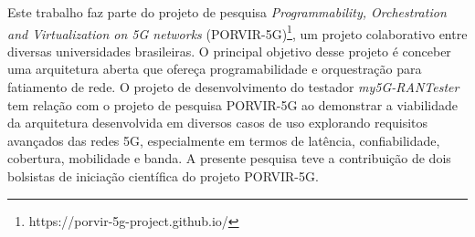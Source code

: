 Este trabalho faz parte do projeto de pesquisa \textit{Programmability, Orchestration and Virtualization on 5G networks} (PORVIR-5G)\footnote{https://porvir-5g-project.github.io/}, um projeto colaborativo entre diversas universidades brasileiras. O principal objetivo desse projeto é conceber uma arquitetura aberta que ofereça programabilidade e orquestração para fatiamento de rede.
O projeto de desenvolvimento do testador \textit{my5G-RANTester} tem relação com o projeto de pesquisa PORVIR-5G ao demonstrar a viabilidade da arquitetura desenvolvida em diversos casos de uso explorando requisitos avançados das redes 5G, especialmente em termos de latência, confiabilidade, cobertura, mobilidade e banda.
A presente pesquisa teve a contribuição de dois bolsistas de iniciação científica do projeto PORVIR-5G.
